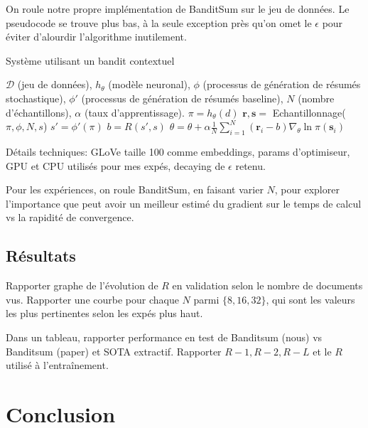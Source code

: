 On roule notre propre implémentation de BanditSum sur le jeu de données.
Le pseudocode se trouve plus bas, à la seule exception près qu'on omet
le $\epsilon$ pour éviter d'alourdir l'algorithme inutilement.

\begin{algorithm}
    \caption{Système utilisant un bandit contextuel}
    \begin{algorithmic}[1]
        \Require  $\mathcal{D}$ (jeu de données), $h_\theta$ (modèle neuronal), $\phi$ (processus de génération de résumés stochastique), $\phi'$ (processus de génération de résumés baseline), $N$ (nombre d'échantillons), $\alpha$ (taux d'apprentissage).
         
        \State $\pi = h_\theta(d)$
        \State $\textbf{r}, \textbf{s} = $ Echantillonnage($\pi, \phi, N, s$)
        \State $s' = \phi'(\pi)$
        \State $b = R(s', s)$ 
        \State $\theta = \theta + \alpha \frac{1}{N} \sum_{i=1}^N (\textbf{r}_i - b) \nabla_\theta \ln \pi(\textbf{s}_i)$
        \EndWhile
    \end{algorithmic}
    \label{alg:approx_J}
\end{algorithm}

Détails techniques: GLoVe taille 100 comme embeddings, params d'optimiseur,
GPU et CPU utilisés pour mes expés, decaying de $\epsilon$ retenu.

Pour les expériences, on roule BanditSum, en faisant varier $N$, pour explorer
l'importance que peut avoir un meilleur estimé du gradient sur le temps de calcul
vs la rapidité de convergence.

\subsection{Résultats}

Rapporter graphe de l'évolution de $R$ en validation selon le nombre de documents vus.
Rapporter une courbe pour chaque $N$ parmi $\{8,16,32\}$, qui sont les valeurs les plus
pertinentes selon les expés plus haut.

Dans un tableau, rapporter performance en test de Banditsum (nous) vs Banditsum (paper) et
SOTA extractif.
Rapporter $R-1, R-2, R-L$ et le $R$ utilisé à l'entraînement.

\section{Conclusion}

